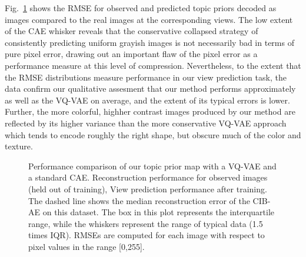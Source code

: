 Fig.~\ref{fig:vs_vqvae} shows the RMSE for observed and predicted topic priors decoded as images compared to the real images at the corresponding views. The low extent of the CAE whisker reveals that the conservative collapsed strategy of consistently predicting uniform grayish images is not necessarily bad in terms of pure pixel error, drawing out an important flaw of the pixel error as a performance measure at this level of compression. Nevertheless, to the extent that the RMSE distributions measure performance in our view prediction task, the data confirm our qualitative assesment that our method performs approximately as well as the VQ-VAE on average, and the extent of its typical errors is lower. Further, the more colorful, highher contrast images produced by our method are reflected by its higher variance than the more conservative VQ-VAE approach which tends to encode roughly the right shape, but obscure much of the color and texture.

\begin{figure}
    \begin{center}
    \end{center}
    \caption{Performance comparison of our topic prior map with a VQ-VAE and a standard CAE.
    \protect{} Reconstruction performance for observed images (held out of training),
    \protect{} View prediction performance after training. The dashed line shows the median reconstruction error of the CIB-AE on this dataset. The box in this plot represents the interquartile range, while the whiskers represent the range of typical data (1.5 times IQR). RMSEs are computed for each image with respect to pixel values in the range [0,255].
    }
    \label{fig:vs_vqvae}
\end{figure}

